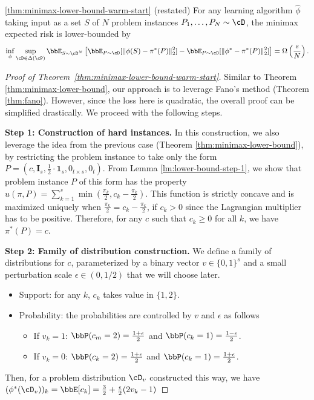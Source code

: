 \begin{customthm}{\ref{thm:minimax-lower-bound-warm-start} (restated)}
    For any learning algorithm $\hat{\phi}$ taking input as a set $S$ of $N$ problem instances $P_1, \dots, P_N \sim \cD$, the minimax expected risk is lower-bounded by
    \[
        \inf_{\phi} \sup_{\cD \in \Delta(\cP)}\bbE_{S \sim \cD^N}\left[ \bbE_{P \sim \cD}[\| \phi(S) - \pi^*(P)\|_2^2] - \bbE_{P \sim \cD}[\|\phi^* - \pi^*(P)\|_2^2] \right] = \Omega\left(\frac{s}{N}\right). 
    \]
\end{customthm}
\begin{proof}[Proof of Theorem~\ref{thm:minimax-lower-bound-warm-start}]
    Similar to Theorem \ref{thm:minimax-lower-bound}, our approach is to leverage Fano's method (Theorem \ref{thm:fano}). However, since the loss here is quadratic, the overall proof can be simplified drastically. We proceed with the following steps.

    \textbf{Step 1: Construction of hard instances.} In this construction, we also leverage the idea from the previous case (Theorem \ref{thm:minimax-lower-bound}), by restricting the problem instance to take only the form $P = (c, \mathbf{I}_s, \frac{1}{2}\cdot \mathbf{1}_s, 0_{t \times s}, 0_t)$. From Lemma \ref{lm:lower-bound-step-1}, we show that problem instance $P$ of this form has the property $u(\pi, P) = \sum_{k = 1}^s \min(\frac{\pi_k}{2}, c_k - \frac{\pi_k}{2})$. This function is strictly concave and is maximized uniquely when $\frac{\pi_k}{2} = c_k - \frac{\pi_k}{2}$, if $c_k > 0$ since the Lagrangian multiplier has to be positive. Therefore, for any $c$ such that $c_k \geq 0$ for all $k$, we have $\pi^*(P) = c$.

     \textbf{Step 2: Family of distribution construction.} We define a family of distributions for $c$, parameterized by a binary vector $v \in \{0, 1\}^s$ and a small perturbation scale $\epsilon \in (0, 1/2)$ that we will choose later.
     \begin{itemize}
         \item Support: for any $k$, $c_k$ takes value in $\{1, 2\}$.
         \item Probability: the probabilities are controlled by $v$ and $\epsilon$ as follows
         \begin{itemize}
             \item If $v_k = 1$: $\bbP(c_m = 2) = \frac{1 + \epsilon}{2}$ and $\bbP(c_k = 1) = \frac{1 - \epsilon}{2}$.
             \item If $v_k = 0$: $\bbP(c_k = 2) = \frac{1 + \epsilon}{2}$ and $\bbP(c_k = 1) = \frac{1 + \epsilon}{2}$.
         \end{itemize}
     \end{itemize}
     Then, for a problem distribution $\cD_{v}$ constructed this way, we have $(\phi^*(\cD_v))_k = \bbE[c_k] = \frac{3}{2} + \frac{\epsilon}{2}(2v_k - 1)$
     

\end{proof}
